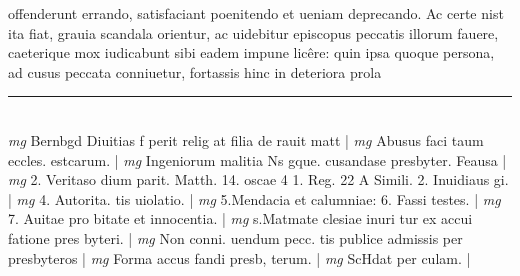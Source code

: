 \documentclass{article}
\begin{document}
\begin{pages}
offenderunt errando, satisfaciant poenitendo et ueniam deprecando. Ac certe nist ita fiat, grauia scandala orientur, ac uidebitur episcopus peccatis illorum fauere, caeterique mox iudicabunt sibi eadem impune licêre: quin ipsa quoque persona, ad cusus peccata conniuetur, fortassis hinc in deteriora prola  \pend
\vspace{0.5cm}\noindent
\vspace{0.2cm}\rule{1cm}{0.2pt}\\ 
\hspace{0.2cm}\textit{mg}
\footnotesize Bernbgd Diuitias f perit relig at filia de rauit matt 
\normalsize| 
\hspace{0.2cm}\textit{mg}
\footnotesize Abusus faci taum eccles. estcarum. 
\normalsize| 
\hspace{0.2cm}\textit{mg}
\footnotesize Ingeniorum malitia Ns gque. cusandase presbyter. Feausa 
\normalsize| 
\hspace{0.2cm}\textit{mg}
\footnotesize 2. Veritaso dium parit. Matth. 14. oscae 4 1. Reg. 22 A Simili.  2. Inuidiaus gi. 
\normalsize| 
\hspace{0.2cm}\textit{mg}
\footnotesize 4. Autorita. tis uiolatio. 
\normalsize| 
\hspace{0.2cm}\textit{mg}
\footnotesize 5.Mendacia et calumniae: 6. Fassi testes. 
\normalsize| 
\hspace{0.2cm}\textit{mg}
\footnotesize 7. Auitae pro bitate et innocentia. 
\normalsize| 
\hspace{0.2cm}\textit{mg}
\footnotesize s.Matmate clesiae inuri tur ex accui fatione pres byteri. 
\normalsize| 
\hspace{0.2cm}\textit{mg}
\footnotesize Non conni. uendum pecc. tis publice admissis per presbyteros 
\normalsize| 
\hspace{0.2cm}\textit{mg}
\footnotesize Forma accus fandi presb, terum. 
\normalsize| 
\hspace{0.2cm}\textit{mg}
\footnotesize ScHdat per culam. 
\normalsize| 

\end{pages}
\end{document}
